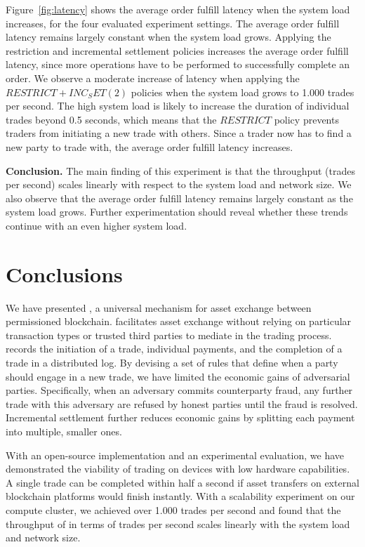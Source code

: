 Figure~\ref{fig:latency} shows the average order fulfill latency when the system load increases, for the four evaluated experiment settings.
The average order fulfill latency remains largely constant when the system load grows.
Applying the restriction and incremental settlement policies increases the average order fulfill latency, since more operations have to be performed to successfully complete an order.
We observe a moderate increase of latency when applying the $ RESTRICT + INC_SET (2) $ policies when the system load grows to 1.000 trades per second.
The high system load is likely to increase the duration of individual trades beyond 0.5 seconds, which means that the $ RESTRICT $ policy prevents traders from initiating a new trade with others.
Since a trader now has to find a new party to trade with, the average order fulfill latency increases.

\textbf{Conclusion.}
The main finding of this experiment is that the throughput (trades per second) scales linearly with respect to the system load and network size.
We also observe that the average order fulfill latency remains largely constant as the system load grows.
Further experimentation should reveal whether these trends continue with an even higher system load.

\section{Conclusions}
We have presented \ModelName{}, a universal mechanism for asset exchange between permissioned blockchain.
\ModelName{} facilitates asset exchange without relying on particular transaction types or trusted third parties to mediate in the trading process.
\ModelName{} records the initiation of a trade, individual payments, and the completion of a trade in a distributed log.
By devising a set of rules that define when a party should engage in a new trade, we have limited the economic gains of adversarial parties.
Specifically, when an adversary commits counterparty fraud, any further trade with this adversary are refused by honest parties until the fraud is resolved.
Incremental settlement further reduces economic gains by splitting each payment into multiple, smaller ones.

With an open-source implementation and an experimental evaluation, we have demonstrated the viability of trading on devices with low hardware capabilities.
A single trade can be completed within half a second if asset transfers on external blockchain platforms would finish instantly.
With a scalability experiment on our compute cluster, we achieved over 1.000 trades per second and found that the throughput of \ModelName{} in terms of trades per second scales linearly with the system load and network size.
